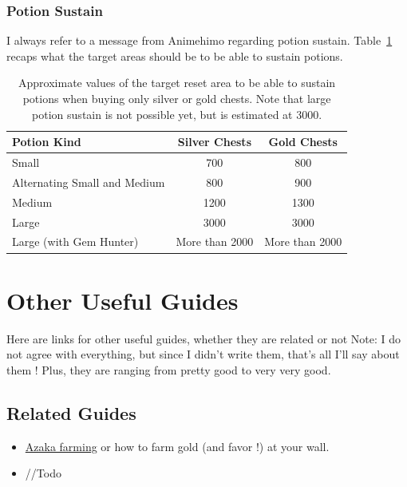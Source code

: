 \documentclass{article}
\begin{document}
\subsubsection{Potion Sustain}
\label{sec:potionSustain}

I always refer to a message from Animehimo regarding potion sustain.
Table~\ref{tbl:potionSustain} recaps what the target areas should be to be able to sustain potions.


\begin{table}[ht!]
\centering
\caption{Approximate values of the target reset area to be able to sustain potions when buying only silver or gold chests.
Note that large potion sustain is not possible yet, but is estimated at 3000.
}
\label{tbl:potionSustain}
\begin{small}
\begin{tabular}{ l | c c }
\toprule
Potion Kind & Silver Chests & Gold Chests \\
\midrule
Small                          & 700 & 800 \\
Alternating Small and Medium   & 800 & 900 \\
Medium                         & 1200 & 1300 \\
Large						   & 3000 & 3000 \\
Large (with Gem Hunter)		   & More than 2000 & More than 2000 \\
\bottomrule
\end{tabular}
\end{small}
\end{table}



\section{Other Useful Guides}

Here are links for other useful guides, whether they are related or not
Note: I do not agree with everything, but since I didn't write them, that's all I'll say  about them !
Plus, they are ranging from pretty good to very very good.

\subsection{Related Guides}
\begin{itemize}
\item \href{https://docs.google.com/document/d/1TT5g3BjKDreYQ3MutCRgeSRGYD8a7GrFfZ96bIllT7o/edit?usp=sharing}{Azaka farming} or how to farm gold (and favor !) at your wall.
\item //Todo
\end{itemize}
\end{document}
